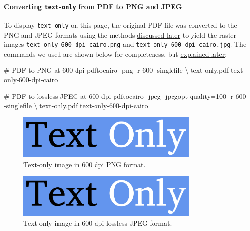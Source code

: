 \documentclass[
  12pt,
  british,
  a4paper,
  rgb,
  dvipsnames,
  svgnames,
  hyphens]{article}
\newenvironment{Shaded}{\begin{snugshade}}{\end{snugshade}}
\newcommand{\AttributeTok}[1]{\textcolor[rgb]{0.80,0.80,0.80}{#1}}
\newcommand{\CommentTok}[1]{\textcolor[rgb]{0.50,0.62,0.50}{#1}}
\newcommand{\DataTypeTok}[1]{\textcolor[rgb]{0.87,0.87,0.75}{#1}}
\newcommand{\ExtensionTok}[1]{\textcolor[rgb]{0.80,0.80,0.80}{#1}}
\newcommand{\NormalTok}[1]{\textcolor[rgb]{0.80,0.80,0.80}{#1}}
\begin{document}
\hypertarget{converting-text-only-from-pdf-to-png-and-jpeg}{%
\paragraph{\texorpdfstring{Converting \texttt{text-only} from PDF to PNG
and
JPEG}{Converting text-only from PDF to PNG and JPEG}}\label{converting-text-only-from-pdf-to-png-and-jpeg}}

To display \texttt{text-only} on this page, the original PDF file was
converted to the PNG and JPEG formats using the methods
\protect\hyperlink{vector-to-raster}{discussed later} to yield the
raster images \texttt{text-only-600-dpi-cairo.png} and
\texttt{text-only-600-dpi-cairo.jpg}. The commands we used are shown
below for completeness, but
\protect\hyperlink{pdf-to-png-and-jpeg-poppler-and-cairo}{explained
later}:

\begin{Shaded}
\begin{Highlighting}[]
\CommentTok{\# PDF to PNG at 600 dpi}
\ExtensionTok{pdftocairo} \AttributeTok{{-}png} \AttributeTok{{-}r}\NormalTok{ 600 }\AttributeTok{{-}singlefile} \DataTypeTok{\textbackslash{}}
\NormalTok{text{-}only.pdf text{-}only{-}600{-}dpi{-}cairo}

\CommentTok{\# PDF to lossless JPEG at 600 dpi}
\ExtensionTok{pdftocairo} \AttributeTok{{-}jpeg} \AttributeTok{{-}jpegopt}\NormalTok{ quality=100 }\AttributeTok{{-}r}\NormalTok{ 600 }\AttributeTok{{-}singlefile} \DataTypeTok{\textbackslash{}}
\NormalTok{text{-}only.pdf text{-}only{-}600{-}dpi{-}cairo}
\end{Highlighting}
\end{Shaded}

\begin{figure}
\hypertarget{fig:text-only-png-cairo}{%
\centering
\includegraphics[width=0.8\textwidth,height=\textheight]{images/text-only-600-dpi-cairo.png}
\caption{Text-only image in 600 dpi PNG
format.}\label{fig:text-only-png-cairo}
}
\end{figure}

\begin{figure}
\hypertarget{fig:text-only-jpg-cairo}{%
\centering
\includegraphics[width=0.8\textwidth,height=\textheight]{images/text-only-600-dpi-cairo.jpg}
\caption{Text-only image in 600 dpi lossless JPEG
format.}\label{fig:text-only-jpg-cairo}
}
\end{figure}
\end{document}
